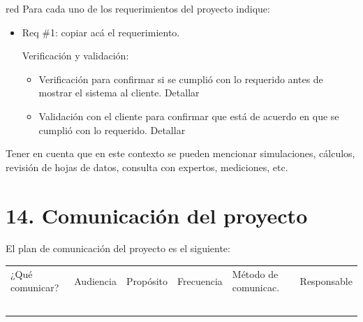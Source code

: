 \documentclass[11pt]{charter}
\begin{document}
\begin{consigna}{red}
Para cada uno de los requerimientos del proyecto indique:
\begin{itemize} 
\item Req \#1: copiar acá el requerimiento.

Verificación y validación:

\begin{itemize}
\item Verificación para confirmar si se cumplió con lo requerido antes de mostrar el sistema al cliente. Detallar 
\item Validación con el cliente para confirmar que está de acuerdo en que se cumplió con lo requerido. Detallar  
\end{itemize}

\end{itemize}

Tener en cuenta que en este contexto se pueden mencionar simulaciones, cálculos, revisión de hojas de datos, consulta con expertos, mediciones, etc.

\end{consigna}

\section{14. Comunicación del proyecto}
\label{sec:comunicaciones}

El plan de comunicación del proyecto es el siguiente:

\begin{table}[htpb]
\centering
\begin{tabularx}{\linewidth}{@{}|X|C{2.4cm}|C{3cm}|C{1.8cm}|C{2cm}|C{2.1cm}|@{}}
\hline
{} 
           \\ \hline
{} 
¿Qué comunicar? & Audiencia & Propósito & Frecuencia & Método de comunicac. & Responsable \\ \hline
                &           &           &            &                      &             \\ \hline
                &           &           &            &                      &             \\ \hline
                &           &           &            &                      &             \\ \hline
                &           &           &            &                      &             \\ \hline
                &           &           &            &                      &             \\ \hline
\end{tabularx}
\end{table}
\end{document}

